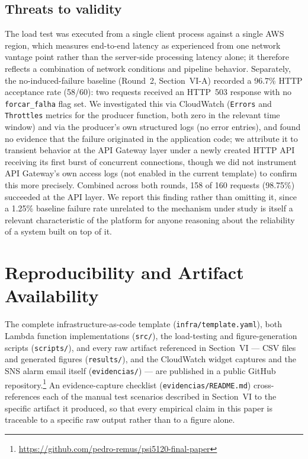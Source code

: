 \documentclass[conference]{IEEEtran}
\begin{document}
\subsection{Threats to validity}
\label{sec:threats}
The load test was executed from a single client process against a single AWS region, which measures end-to-end latency as experienced from one network vantage point rather than the server-side processing latency alone; it therefore reflects a combination of network conditions and pipeline behavior. Separately, the no-induced-failure baseline (Round~2, Section~VI-A) recorded a 96.7\% HTTP acceptance rate (58/60): two requests received an HTTP~503 response with no \texttt{forcar\_falha} flag set. We investigated this via CloudWatch (\texttt{Errors} and \texttt{Throttles} metrics for the producer function, both zero in the relevant time window) and via the producer's own structured logs (no error entries), and found no evidence that the failure originated in the application code; we attribute it to transient behavior at the API Gateway layer under a newly created HTTP API receiving its first burst of concurrent connections, though we did not instrument API Gateway's own access logs (not enabled in the current template) to confirm this more precisely. Combined across both rounds, 158 of 160 requests (98.75\%) succeeded at the API layer. We report this finding rather than omitting it, since a 1.25\% baseline failure rate unrelated to the mechanism under study is itself a relevant characteristic of the platform for anyone reasoning about the reliability of a system built on top of it.

\section{Reproducibility and Artifact Availability}

The complete infrastructure-as-code template (\texttt{infra/template.yaml}), both Lambda function implementations (\texttt{src/}), the load-testing and figure-generation scripts (\texttt{scripts/}), and every raw artifact referenced in Section~VI --- CSV files and generated figures (\texttt{results/}), and the CloudWatch widget captures and the SNS alarm email itself (\texttt{evidencias/}) --- are published in a public GitHub repository.\footnote{\url{https://github.com/pedro-remus/psi5120-final-paper}} An evidence-capture checklist (\texttt{evidencias/README.md}) cross-references each of the manual test scenarios described in Section~VI to the specific artifact it produced, so that every empirical claim in this paper is traceable to a specific raw output rather than to a figure alone.
\end{document}
